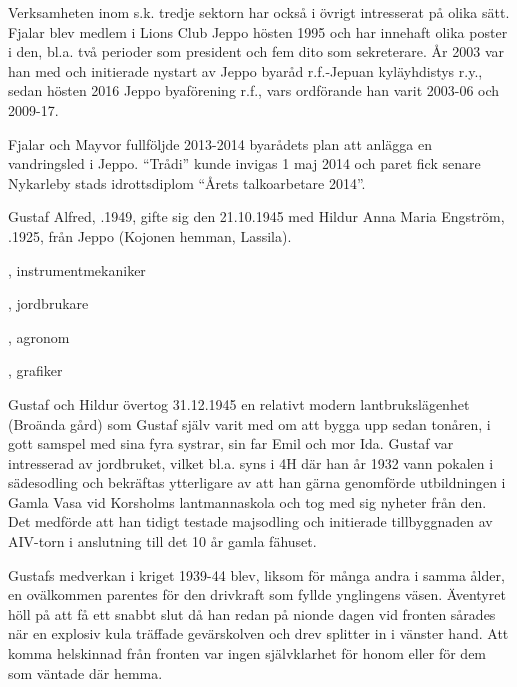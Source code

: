 Verksamheten inom s.k. tredje sektorn har också i övrigt intresserat på olika sätt. Fjalar blev medlem i Lions Club Jeppo hösten 1995 och	har innehaft olika poster i den, bl.a. två perioder som president och	fem dito som sekreterare. År 2003 var han med och initierade	nystart av Jeppo byaråd r.f.-Jepuan kyläyhdistys r.y., sedan hösten	2016 Jeppo byaförening r.f., vars ordförande han varit 2003-06 och 2009-17.

Fjalar och Mayvor fullföljde 2013-2014 byarådets plan att anlägga en vandringsled i Jeppo. ``Trådi'' kunde invigas 1 maj 2014 och paret fick senare Nykarleby stads idrottsdiplom ``Årets talkoarbetare 2014''.





Gustaf Alfred, .1949, gifte sig den 21.10.1945 med Hildur Anna Maria Engström, .1925, från Jeppo (Kojonen hemman, Lassila).

\begin{jhchildren}
  \item {}, instrumentmekaniker
  \item {}, jordbrukare
  \item {}, agronom
  \item {}, grafiker
\end{jhchildren}


Gustaf och Hildur övertog 31.12.1945 en relativt modern lantbrukslägenhet (Broända gård) som Gustaf själv varit med om att bygga upp sedan tonåren, i gott samspel med sina fyra systrar, sin far Emil och mor Ida. Gustaf var intresserad av jordbruket, vilket bl.a. syns i 4H där han år 1932 vann pokalen i sädesodling och bekräftas ytterligare av att han gärna genomförde utbildningen i Gamla Vasa vid 	Korsholms lantmannaskola och tog med sig nyheter från den. Det medförde att han tidigt testade majsodling och initierade tillbyggnaden av AIV-torn i anslutning till det 10 år gamla fähuset.

Gustafs medverkan i kriget 1939-44 blev, liksom för många andra i samma ålder, en ovälkommen parentes för den drivkraft som fyllde 	ynglingens väsen. Äventyret höll på att få ett snabbt slut då han redan på nionde dagen vid fronten sårades när en explosiv kula träffade 	gevärskolven och drev splitter in i vänster hand. Att komma helskinnad från fronten var ingen självklarhet för honom eller för dem som väntade där hemma.

